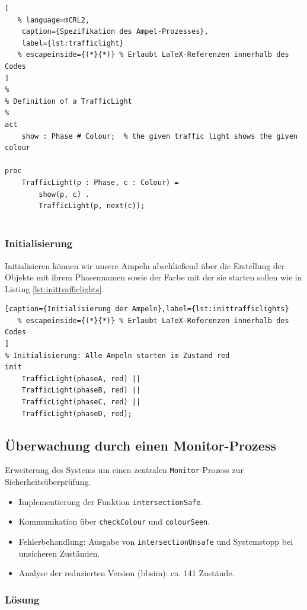 \documentclass{article}
\begin{document}
\begin{lstlisting}[
   % language=mCRL2, 
    caption={Spezifikation des Ampel-Prozesses}, 
    label={lst:trafficlight}
   % escapeinside={(*}{*)} % Erlaubt LaTeX-Referenzen innerhalb des Codes
]
%
% Definition of a TrafficLight
%
act
    show : Phase # Colour;  % the given traffic light shows the given colour

proc 
    TrafficLight(p : Phase, c : Colour) = 
        show(p, c) . 
        TrafficLight(p, next(c)); 


\end{lstlisting} 


\subsubsection{Initialisierung}
Initialisieren können wir unsere Ampeln abschließend über die Erstellung der Objekte mit ihrem Phasennamen sowie der Farbe mit der sie starten sollen wie in Listing \ref{lst:inittrafficlights}.


\begin{lstlisting}[caption={Initialisierung der Ampeln},label={lst:inittrafficlights}
   % escapeinside={(*}{*)} % Erlaubt LaTeX-Referenzen innerhalb des Codes
]
% Initialisierung: Alle Ampeln starten im Zustand red
init
    TrafficLight(phaseA, red) || 
    TrafficLight(phaseB, red) || 
    TrafficLight(phaseC, red) || 
    TrafficLight(phaseD, red);
\end{lstlisting} 




\subsection{Überwachung durch einen Monitor-Prozess}
Erweiterung des Systems um einen zentralen \texttt{Monitor}-Prozess zur Sicherheitsüberprüfung.
\begin{itemize}
    \item Implementierung der Funktion \texttt{intersectionSafe}.
    \item Kommunikation über \texttt{checkColour} und \texttt{colourSeen}.
    \item Fehlerbehandlung: Ausgabe von \texttt{intersectionUnsafe} und Systemstopp bei unsicheren Zuständen.
    \item Analyse der reduzierten Version (bbsim): ca. 141 Zustände.
\end{itemize}

\subsubsection*{Lösung}
\end{document}
